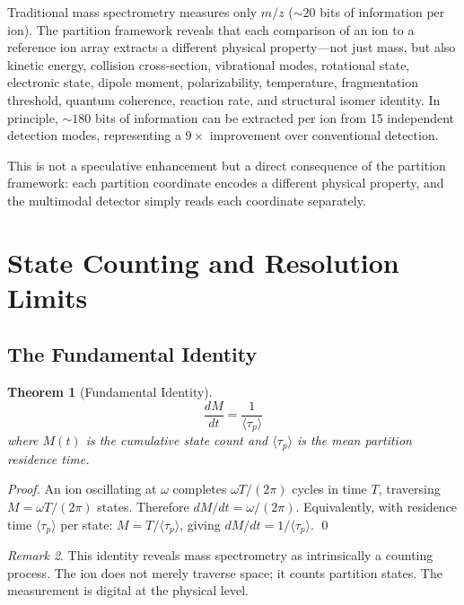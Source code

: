 \documentclass[twocolumn,10pt,a4paper]{article}
\newtheorem{theorem}{Theorem}[section]
\theoremstyle{definition}
\theoremstyle{remark}
\newtheorem{remark}[theorem]{Remark}
\newcommand{\taup}{\tau_p}
\begin{document}
Traditional mass spectrometry measures only $m/z$ ($\sim 20$ bits of information per ion). The partition framework reveals that each comparison of an ion to a reference ion array extracts a different physical property---not just mass, but also kinetic energy, collision cross-section, vibrational modes, rotational state, electronic state, dipole moment, polarizability, temperature, fragmentation threshold, quantum coherence, reaction rate, and structural isomer identity. In principle, $\sim 180$ bits of information can be extracted per ion from 15 independent detection modes, representing a $9\times$ improvement over conventional detection.

This is not a speculative enhancement but a direct consequence of the partition framework: each partition coordinate encodes a different physical property, and the multimodal detector simply reads each coordinate separately.

\section{State Counting and Resolution Limits}
\label{sec:counting}

\subsection{The Fundamental Identity}

\begin{theorem}[Fundamental Identity]
\label{thm:fundamental}
\begin{equation}
    \boxed{\frac{dM}{dt} = \frac{1}{\langle\taup\rangle}}
    \label{eq:fundamental}
\end{equation}
where $M(t)$ is the cumulative state count and $\langle\taup\rangle$ is the mean partition residence time.
\end{theorem}

\begin{proof}
An ion oscillating at $\omega$ completes $\omega T/(2\pi)$ cycles in time $T$, traversing $M = \omega T/(2\pi)$ states. Therefore $dM/dt = \omega/(2\pi)$. Equivalently, with residence time $\langle\taup\rangle$ per state: $M = T/\langle\taup\rangle$, giving $dM/dt = 1/\langle\taup\rangle$. \qed
\end{proof}

\begin{remark}
This identity reveals mass spectrometry as intrinsically a counting process. The ion does not merely traverse space; it counts partition states. The measurement is digital at the physical level.
\end{remark}
\end{document}
